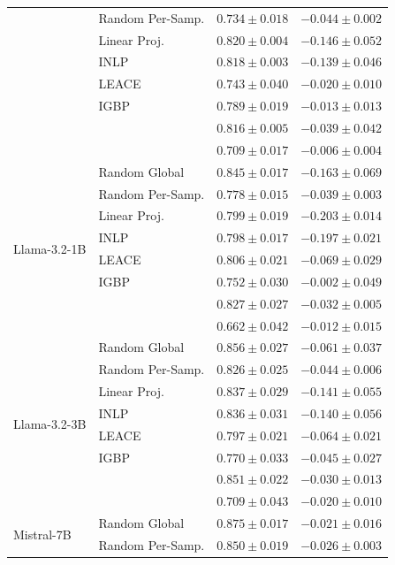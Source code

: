 \begin{longtable}{ll rr}
   & Random Per-Samp. & $0.734{\pm}0.018$ & $-0.044{\pm}0.002$ \\
   & Linear Proj. & $0.820{\pm}0.004$ & $-0.146{\pm}0.052$ \\
   & INLP & $0.818{\pm}0.003$ & $-0.139{\pm}0.046$ \\
   & LEACE & $0.743{\pm}0.040$ & $-0.020{\pm}0.010$ \\
   & IGBP & $0.789{\pm}0.019$ & $-0.013{\pm}0.013$ \\
   & \AmbGCE{} & $0.816{\pm}0.005$ & $-0.039{\pm}0.042$ \\
   & \TanGCE{} & \textbf{$0.709{\pm}0.017$} & $-0.006{\pm}0.004$ \\
  \midrule
  \multirow{8}{*}{Llama-3.2-1B} & Random Global & $0.845{\pm}0.017$ & $-0.163{\pm}0.069$ \\
   & Random Per-Samp. & $0.778{\pm}0.015$ & $-0.039{\pm}0.003$ \\
   & Linear Proj. & $0.799{\pm}0.019$ & $-0.203{\pm}0.014$ \\
   & INLP & $0.798{\pm}0.017$ & $-0.197{\pm}0.021$ \\
   & LEACE & $0.806{\pm}0.021$ & $-0.069{\pm}0.029$ \\
   & IGBP & $0.752{\pm}0.030$ & $-0.002{\pm}0.049$ \\
   & \AmbGCE{} & $0.827{\pm}0.027$ & $-0.032{\pm}0.005$ \\
   & \TanGCE{} & \textbf{$0.662{\pm}0.042$} & $-0.012{\pm}0.015$ \\
  \midrule
  \multirow{8}{*}{Llama-3.2-3B} & Random Global & $0.856{\pm}0.027$ & $-0.061{\pm}0.037$ \\
   & Random Per-Samp. & $0.826{\pm}0.025$ & $-0.044{\pm}0.006$ \\
   & Linear Proj. & $0.837{\pm}0.029$ & $-0.141{\pm}0.055$ \\
   & INLP & $0.836{\pm}0.031$ & $-0.140{\pm}0.056$ \\
   & LEACE & $0.797{\pm}0.021$ & $-0.064{\pm}0.021$ \\
   & IGBP & $0.770{\pm}0.033$ & $-0.045{\pm}0.027$ \\
   & \AmbGCE{} & $0.851{\pm}0.022$ & $-0.030{\pm}0.013$ \\
   & \TanGCE{} & \textbf{$0.709{\pm}0.043$} & $-0.020{\pm}0.010$ \\
  \midrule
  \multirow{8}{*}{Mistral-7B} & Random Global & $0.875{\pm}0.017$ & $-0.021{\pm}0.016$ \\
   & Random Per-Samp. & $0.850{\pm}0.019$ & $-0.026{\pm}0.003$ \\

\end{longtable}
